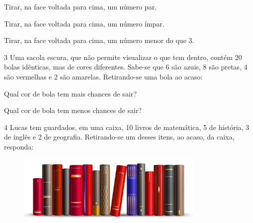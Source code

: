 \begin{escolha}
\item Tirar, na face voltada para cima, um número par.

\item Tirar, na face voltada para cima, um número ímpar.

\item Tirar, na face voltada para cima, um número menor do que 3.
\end{escolha}

\num{3} Uma sacola escura, que não permite visualizar o que tem dentro, contém
20 bolas idênticas, mas de cores diferentes. Sabe-se que 6 são azuis, 8
são pretas, 4 são vermelhas e 2 são amarelas. Retirando-se uma bola ao
acaso:

\begin{escolha}
\item Qual cor de bola tem mais chances de sair?

\item  Qual cor de bola tem menos chances de sair?
\end{escolha}


\num{4} Lucas tem guardados, em uma caixa, 10 livros de matemática, 5 de história, 3 de inglês e
2 de geografia. Retirando-se um desses itens, ao acaso, da caixa,
responda:

\begin{figure}[htpb!]
\centering
\includegraphics[width=0.8\textwidth]{./media/image75b.jpg}
\end{figure}

